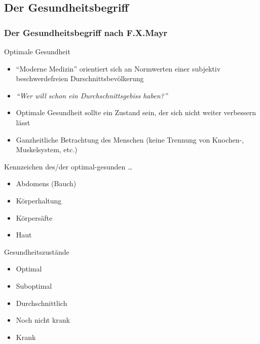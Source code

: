 \documentclass[xcolor=dvipsnames]{beamer}
\begin{document}
    \subsection{Der Gesundheitsbegriff}
    \begin{frame}[allowframebreaks]
        \frametitle{Der Gesundheitsbegriff nach F.X.Mayr}

        \begin{block}{Optimale Gesundheit}
            \begin{itemize}
                \setlength\itemsep{1em}
                \item "`Moderne Medizin"' orientiert sich an Normwerten einer subjektiv beschwerdefreien Durschnittsbevölkerung
                \item \textit{"`Wer will schon ein Durchschnittsgebiss haben?"'}
                \item Optimale Gesundheit sollte ein Zustand sein, der sich nicht weiter verbessern lässt
                \item Ganzheitliche Betrachtung des Menschen (keine Trennung von Knochen-, Muskelsystem, etc.)
            \end{itemize}
        \end{block}

        \framebreak

        \begin{block}{Kennzeichen des/der optimal-gesunden \ldots}
            \begin{itemize}
                \setlength\itemsep{1em}
                \item Abdomens (Bauch)
                \item Körperhaltung
                \item Körpersäfte
                \item Haut
            \end{itemize}
        \end{block}

        \begin{block}{Gesundheitszustände}
            \begin{itemize}
                \item Optimal
                \item Suboptimal
                \item Durchschnittlich
                \item Noch nicht krank
                \item Krank
            \end{itemize}
        \end{block}
    \end{frame}
\end{document}
